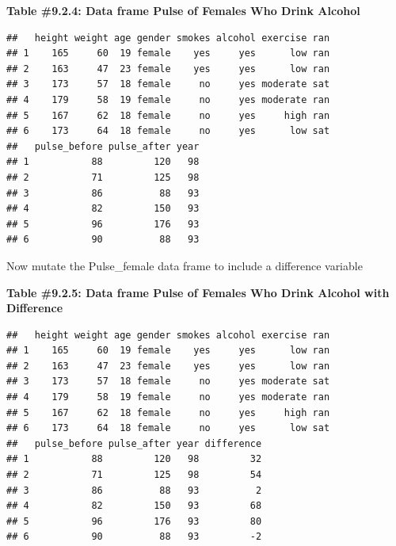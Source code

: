\documentclass[
]{book}
\newenvironment{Shaded}{\begin{snugshade}}{\end{snugshade}}
\newcommand{\DataTypeTok}[1]{\textcolor[rgb]{0.13,0.29,0.53}{#1}}
\newcommand{\KeywordTok}[1]{\textcolor[rgb]{0.13,0.29,0.53}{\textbf{#1}}}
\newcommand{\NormalTok}[1]{#1}
\newcommand{\OperatorTok}[1]{\textcolor[rgb]{0.81,0.36,0.00}{\textbf{#1}}}
\newcommand{\StringTok}[1]{\textcolor[rgb]{0.31,0.60,0.02}{#1}}
\begin{document}
\textbf{Table \#9.2.4: Data frame Pulse of Females Who Drink Alcohol}

\begin{Shaded}
\end{Shaded}

\begin{verbatim}
##   height weight age gender smokes alcohol exercise ran
## 1    165     60  19 female    yes     yes      low ran
## 2    163     47  23 female    yes     yes      low ran
## 3    173     57  18 female     no     yes moderate sat
## 4    179     58  19 female     no     yes moderate ran
## 5    167     62  18 female     no     yes     high ran
## 6    173     64  18 female     no     yes      low sat
##   pulse_before pulse_after year
## 1           88         120   98
## 2           71         125   98
## 3           86          88   93
## 4           82         150   93
## 5           96         176   93
## 6           90          88   93
\end{verbatim}

Now mutate the Pulse\_female data frame to include a difference variable

\textbf{Table \#9.2.5: Data frame Pulse of Females Who Drink Alcohol with Difference}

\begin{Shaded}
\end{Shaded}

\begin{verbatim}
##   height weight age gender smokes alcohol exercise ran
## 1    165     60  19 female    yes     yes      low ran
## 2    163     47  23 female    yes     yes      low ran
## 3    173     57  18 female     no     yes moderate sat
## 4    179     58  19 female     no     yes moderate ran
## 5    167     62  18 female     no     yes     high ran
## 6    173     64  18 female     no     yes      low sat
##   pulse_before pulse_after year difference
## 1           88         120   98         32
## 2           71         125   98         54
## 3           86          88   93          2
## 4           82         150   93         68
## 5           96         176   93         80
## 6           90          88   93         -2
\end{verbatim}
\end{document}
